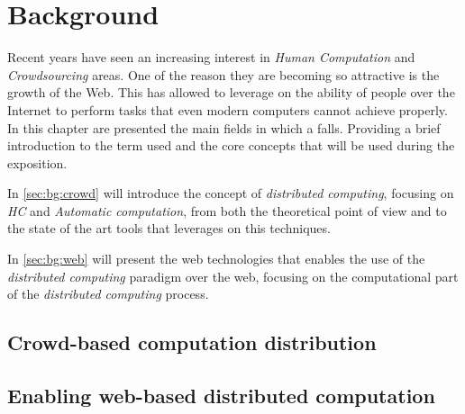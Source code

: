 \chapter{Background}
\label{cap:bg}


Recent years have seen an increasing interest in \emph{Human Computation}
and \emph{Crowdsourcing} areas. One of the reason they are becoming
so attractive is the growth of the Web. This has allowed to leverage
on the ability of people over the Internet to perform tasks that even
modern computers cannot achieve properly.\\

In this chapter are presented the main fields in which a \emph{\myTitle} falls.
Providing a brief introduction to the term used and the core concepts that will
be used during the exposition.

In \autoref{sec:bg:crowd} will introduce the concept of \emph{distributed
computing}, focusing on \emph{\ac{HC}} and \emph{Automatic computation}, from
both the theoretical point of view and to the state of the art tools that
leverages on this techniques.

In \autoref{sec:bg:web} will present the web technologies that enables the 
use of the \emph{distributed computing} paradigm over the web, focusing on the
computational part of the \emph{distributed computing} process.

\section{Crowd-based computation distribution}
\label{sec:bg:crowd}




\section{Enabling web-based distributed computation}
\label{sec:bg:web}

